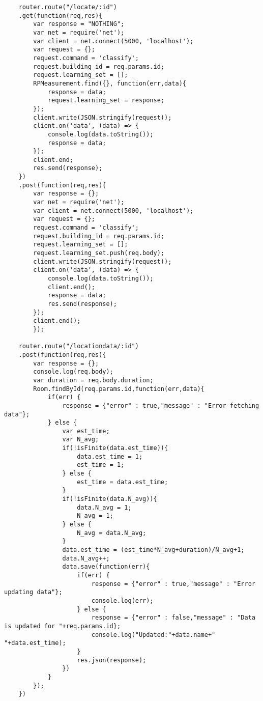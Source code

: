 \begin{lstlisting}
    router.route("/locate/:id")
    .get(function(req,res){
        var response = "NOTHING";
        var net = require('net');
        var client = net.connect(5000, 'localhost');
        var request = {};
        request.command = 'classify';
        request.building_id = req.params.id;
        request.learning_set = [];  
        RPMeasurement.find({}, function(err,data){
            response = data;
            request.learning_set = response;
        });
        client.write(JSON.stringify(request));
        client.on('data', (data) => {
            console.log(data.toString());
            response = data;
        });
        client.end;
        res.send(response);
    })
    .post(function(req,res){
        var response = {};
        var net = require('net');
        var client = net.connect(5000, 'localhost');
        var request = {};
        request.command = 'classify';
        request.building_id = req.params.id;
        request.learning_set = [];
        request.learning_set.push(req.body);
        client.write(JSON.stringify(request));
        client.on('data', (data) => {
            console.log(data.toString());
            client.end();
            response = data;
            res.send(response);
        });
        client.end();
        });

    router.route("/locationdata/:id")
    .post(function(req,res){
        var response = {};        
        console.log(req.body);
        var duration = req.body.duration;
        Room.findById(req.params.id,function(err,data){
            if(err) {
                response = {"error" : true,"message" : "Error fetching data"};
            } else {
                var est_time;
                var N_avg;
                if(!isFinite(data.est_time)){
                    data.est_time = 1;
                    est_time = 1;
                } else {
                    est_time = data.est_time;
                }
                if(!isFinite(data.N_avg)){
                    data.N_avg = 1;
                    N_avg = 1;
                } else {
                    N_avg = data.N_avg;
                }
                data.est_time = (est_time*N_avg+duration)/N_avg+1;
                data.N_avg++;
                data.save(function(err){
                    if(err) {
                        response = {"error" : true,"message" : "Error updating data"};
                        console.log(err);
                    } else {
                        response = {"error" : false,"message" : "Data is updated for "+req.params.id};
                        console.log("Updated:"+data.name+" "+data.est_time);
                    }
                    res.json(response);
                })
            }
        });
    })



\end{lstlisting}
